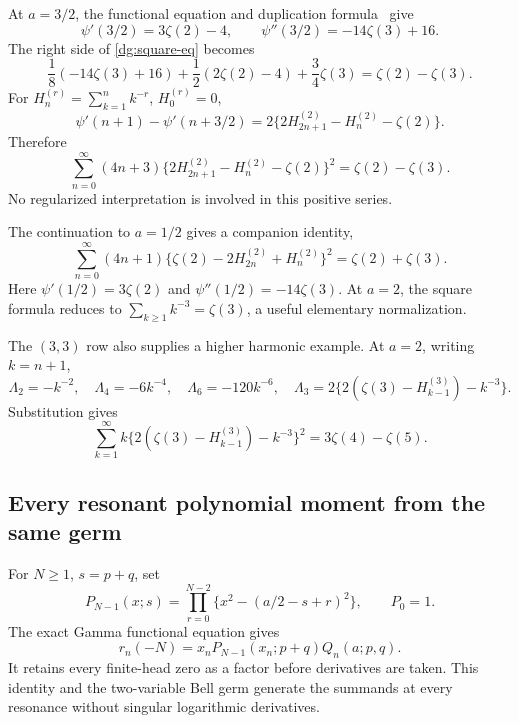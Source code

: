 \documentclass[11pt,a4paper]{article}
\numberwithin{equation}{section}
\theoremstyle{definition}
\theoremstyle{remark}
\begin{document}
At $a=3/2$, the functional equation and duplication formula~\cite{DLMFPolygamma} give
\[
 \psi'(3/2)=3\zeta(2)-4,\qquad
 \psi''(3/2)=-14\zeta(3)+16.
\]
The right side of \eqref{dg:square-eq} becomes
\[
 \frac18(-14\zeta(3)+16)
 +\frac12(2\zeta(2)-4)+\frac34\zeta(3)
 =\zeta(2)-\zeta(3).
\]
For $H_n^{(r)}=\sum_{k=1}^nk^{-r}$, $H_0^{(r)}=0$,
\[
 \psi'(n+1)-\psi'(n+3/2)
 =2\{2H_{2n+1}^{(2)}-H_n^{(2)}-\zeta(2)\}.
\]
Therefore
\begin{equation}
 \boxed{\sum_{n=0}^{\infty}(4n+3)
 \{2H_{2n+1}^{(2)}-H_n^{(2)}-\zeta(2)\}^{2}
 =\zeta(2)-\zeta(3).}
 \label{dg:half-harmonic-square}
\end{equation}
No regularized interpretation is involved in this positive series.

The continuation to $a=1/2$ gives a companion identity,
\begin{equation}
 \sum_{n=0}^{\infty}(4n+1)
 \{\zeta(2)-2H_{2n}^{(2)}+H_n^{(2)}\}^{2}
 =\zeta(2)+\zeta(3).
 \label{dg:other-half-harmonic-square}
\end{equation}
Here $\psi'(1/2)=3\zeta(2)$ and
$\psi''(1/2)=-14\zeta(3)$. At $a=2$, the square formula reduces to
$\sum_{k\geq1}k^{-3}=\zeta(3)$, a useful elementary normalization.

The $(3,3)$ row also supplies a higher harmonic example. At $a=2$,
writing $k=n+1$,
\[
 \Lambda_2=-k^{-2},\quad \Lambda_4=-6k^{-4},\quad
 \Lambda_6=-120k^{-6},\quad
 \Lambda_3=2\{2(\zeta(3)-H_{k-1}^{(3)})-k^{-3}\}.
\]
Substitution gives
\begin{equation}
 \boxed{\sum_{k=1}^{\infty}k
 \{2(\zeta(3)-H_{k-1}^{(3)})-k^{-3}\}^2
 =3\zeta(4)-\zeta(5).}
 \label{dg:cubic-tail-square}
\end{equation}

\subsection{Every resonant polynomial moment from the same germ}

For $N\geq1$, $s=p+q$, set
\[
 P_{N-1}(x;s)=\prod_{r=0}^{N-2}\{x^2-(a/2-s+r)^2\},\qquad P_0=1.
\]
The exact Gamma functional equation gives
\begin{equation}
 r_n(-N)=x_nP_{N-1}(x_n;p+q)Q_n(a;p,q).
 \label{dg:N-transport}
\end{equation}
It retains every finite-head zero as a factor before derivatives are
taken. This identity and the two-variable Bell germ generate the
summands at every resonance without singular logarithmic derivatives.
\end{document}
